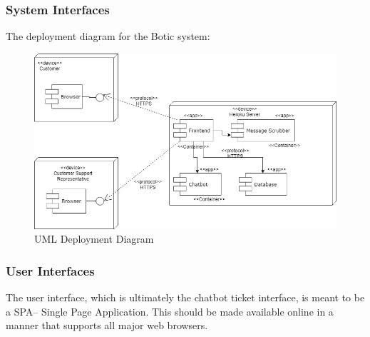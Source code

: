 \documentclass[11pt]{article}
\begin{document}
\subsubsection{System Interfaces}

The deployment diagram for the Botic system:



\begin{figure}[H]
	\centering
	\includegraphics[width=1.0\textwidth]{../../images/Botic_Deployment_Diagram.jpg}
	\caption{UML Deployment Diagram}
\end{figure}

\subsubsection{User Interfaces}

The user interface, which is ultimately the chatbot ticket interface, is meant to be a SPA-- Single Page Application. This should be made available online in a manner that supports all major web browsers.
\end{document}

